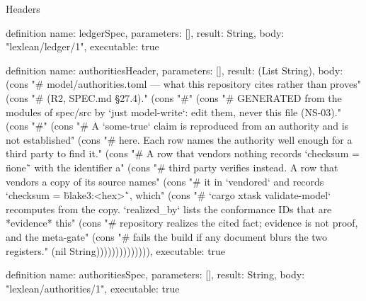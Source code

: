 \begin{lexlean}{Headers}
\begin{semanticmodule}
definition{
  name: ledgerSpec,
  parameters: [],
  result: String,
  body: "lexlean/ledger/1",
  executable: true
}

definition{
  name: authoritiesHeader,
  parameters: [],
  result: (List String),
  body: (cons "# model/authorities.toml --- what this repository cites rather than proves" (cons "# (R2, SPEC.md §27.4)." (cons "#" (cons "# GENERATED from the modules of spec/src by `just model-write`: edit them, never this file (NS-03)." (cons "#" (cons "# A `some-true` claim is reproduced from an authority and is not established" (cons "# here. Each row names the authority well enough for a third party to find it." (cons "# A row that vendors nothing records `checksum = \"none\"` with the identifier a" (cons "# third party verifies instead. A row that vendors a copy of its source names" (cons "# it in `vendored` and records `checksum = \"blake3:<hex>\"`, which" (cons "# `cargo xtask validate-model` recomputes from the copy. `realized_by` lists the conformance IDs that are *evidence* this" (cons "# repository realizes the cited fact; evidence is not proof, and the meta-gate" (cons "# fails the build if any document blurs the two registers." (nil String)))))))))))))),
  executable: true
}

definition{
  name: authoritiesSpec,
  parameters: [],
  result: String,
  body: "lexlean/authorities/1",
  executable: true
}
\end{semanticmodule}
\end{lexlean}

